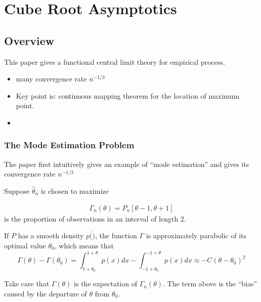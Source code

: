 
\chapter{Cube Root Asymptotics}
\section*{Overview}
This paper gives a functional central limit theory for empirical process.

\begin{itemize}
  \item many convergence rate $n^{-1/3}$
  \item Key point is: continuous mapping theorem for the location of maximum point.
  \item 
\end{itemize}






\subsection{The Mode Estimation Problem}

The paper first intuitively gives an example of ``mode estimation'' and gives its convergence rate $n^{-1/3}$

Suppose $\hat \theta_n$ is chosen to maximize

\begin{align}
    \Gamma_n(\theta) = P_n[\theta - 1,\theta + 1]
\end{align}
is the proportion of observations in an interval of length 2.

If $P$ has a smooth density $p(\dot)$,
the function $\Gamma$ is approximately parabolic of its optimal value $\theta_0$, which means that 
$$
\Gamma(\theta)-\Gamma\left(\theta_0\right)=\int_{1+\theta_0}^{1+\theta} p(x) d x-\int_{-1+\theta_0}^{-1+\theta} p(x) d x \approx-C \left(\theta-\theta_0\right)^2
$$

\begin{summary}
  Take care that $\Gamma(\theta)$ is the expectation of $\Gamma_n(\theta)$.
  The term above  is the ``bias'' caused by the departure of $\theta$ from $\theta_0$.
\end{summary}


